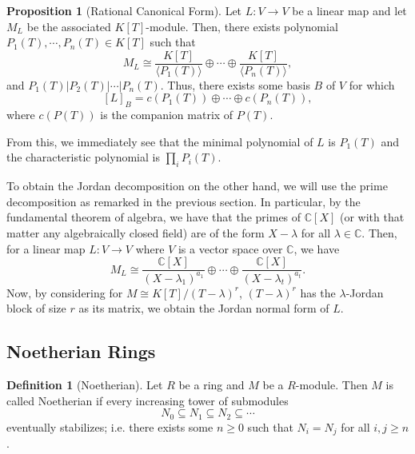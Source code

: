 \documentclass[]{article}
\theoremstyle{definition}
\theoremstyle{definition}
\newtheorem{definition}{Definition}[section]
\newtheorem{proposition}{Proposition}[section]
\begin{document}
\begin{proposition}[Rational Canonical Form]
  Let \(L : V \to V\) be a linear map and let \(M_L\) be the associated 
  \(K[T]\)-module. Then, there exists polynomial \(P_1(T), \cdots, P_n(T) \in K[T]\)
  such that 
  \[M_L \cong \frac{K[T]}{\langle P_1(T) \rangle} \oplus \cdots 
  \oplus \frac{K[T]}{\langle P_n(T) \rangle},\]
  and \(P_1(T) | P_2(T) | \cdots | P_n(T)\). Thus, there exists some basis \(B\) 
  of \(V\) for which 
  \[[L]_B = c(P_1(T)) \oplus \cdots \oplus c(P_n(T)),\]
  where \(c(P(T))\) is the companion matrix of \(P(T)\).
\end{proposition}

From this, we immediately see that the minimal polynomial of \(L\) is 
\(P_1(T)\) and the characteristic polynomial is \(\prod_i P_i(T)\).

To obtain the Jordan decomposition on the other hand, we will use the prime 
decomposition as remarked in the previous section. In particular, by the 
fundamental theorem of algebra, we have that the primes of \(\mathbb{C}[X]\) 
(or with that matter any algebraically closed field) are of the form 
\(X - \lambda\) for all \(\lambda \in \mathbb{C}\). Then, for a linear map 
\(L : V \to V\) where \(V\) is a vector space over \(\mathbb{C}\), we have 
\[M_L \cong \frac{\mathbb{C}[X]}{(X - \lambda_1)^{a_1}} \oplus \cdots \oplus 
  \frac{\mathbb{C}[X]}{(X - \lambda_t)^{a_t}}.\]
Now, by considering for \(M \cong K[T]/(T - \lambda)^r\), 
\((T - \lambda)^r\) has the 
\(\lambda\)-Jordan block of size \(r\) as its matrix, we obtain the Jordan 
normal form of \(L\).

\subsection{Noetherian Rings}

\begin{definition}[Noetherian]
  Let \(R\) be a ring and \(M\) be a \(R\)-module. Then \(M\) is called Noetherian 
  if every increasing tower of submodules 
  \[N_0 \subseteq N_1 \subseteq N_2 \subseteq \cdots\]
  eventually stabilizes; i.e. there exists some \(n \ge 0\) such that \(N_i = N_j\) 
  for all \(i, j \ge n\).
\end{definition}
\end{document}
